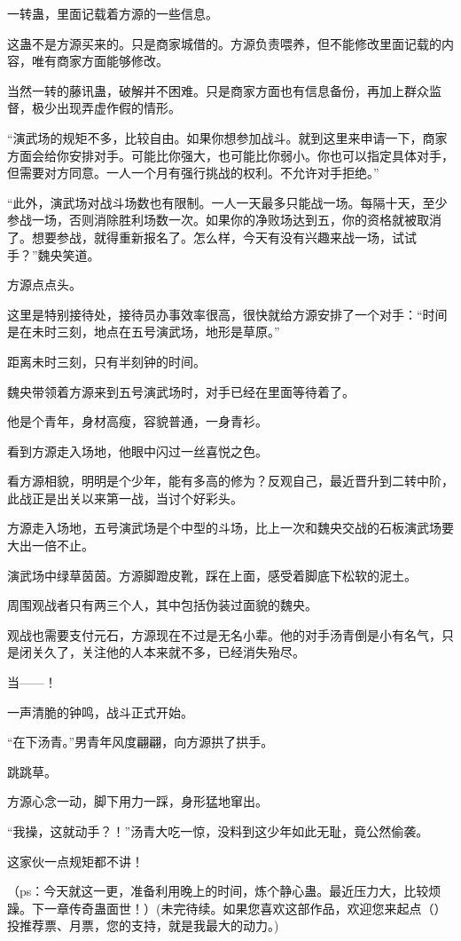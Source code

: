 \begin{this_body}
一转蛊，里面记载着方源的一些信息。

这蛊不是方源买来的。只是商家城借的。方源负责喂养，但不能修改里面记载的内容，唯有商家方面能够修改。

当然一转的藤讯蛊，破解并不困难。只是商家方面也有信息备份，再加上群众监督，极少出现弄虚作假的情形。

“演武场的规矩不多，比较自由。如果你想参加战斗。就到这里来申请一下，商家方面会给你安排对手。可能比你强大，也可能比你弱小。你也可以指定具体对手，但需要对方同意。一人一个月有强行挑战的权利。不允许对手拒绝。”

“此外，演武场对战斗场数也有限制。一人一天最多只能战一场。每隔十天，至少参战一场，否则消除胜利场数一次。如果你的净败场达到五，你的资格就被取消了。想要参战，就得重新报名了。怎么样，今天有没有兴趣来战一场，试试手？”魏央笑道。

方源点点头。

这里是特别接待处，接待员办事效率很高，很快就给方源安排了一个对手：“时间是在未时三刻，地点在五号演武场，地形是草原。”

距离未时三刻，只有半刻钟的时间。

魏央带领着方源来到五号演武场时，对手已经在里面等待着了。

他是个青年，身材高瘦，容貌普通，一身青衫。

看到方源走入场地，他眼中闪过一丝喜悦之色。

看方源相貌，明明是个少年，能有多高的修为？反观自己，最近晋升到二转中阶，此战正是出关以来第一战，当讨个好彩头。

方源走入场地，五号演武场是个中型的斗场，比上一次和魏央交战的石板演武场要大出一倍不止。

演武场中绿草茵茵。方源脚蹬皮靴，踩在上面，感受着脚底下松软的泥土。

周围观战者只有两三个人，其中包括伪装过面貌的魏央。

观战也需要支付元石，方源现在不过是无名小辈。他的对手汤青倒是小有名气，只是闭关久了，关注他的人本来就不多，已经消失殆尽。

当——！

一声清脆的钟鸣，战斗正式开始。

“在下汤青。”男青年风度翩翩，向方源拱了拱手。

跳跳草。

方源心念一动，脚下用力一踩，身形猛地窜出。

“我操，这就动手？！”汤青大吃一惊，没料到这少年如此无耻，竟公然偷袭。

这家伙一点规矩都不讲！

（ps：今天就这一更，准备利用晚上的时间，炼个静心蛊。最近压力大，比较烦躁。下一章传奇蛊面世！）(未完待续。如果您喜欢这部作品，欢迎您来起点（）投推荐票、月票，您的支持，就是我最大的动力。)

\end{this_body}

